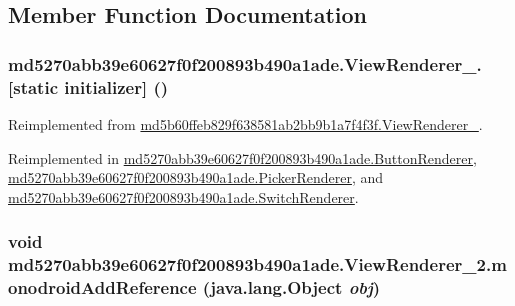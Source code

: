 \subsection{Member Function Documentation}
\hypertarget{classmd5270abb39e60627f0f200893b490a1ade_1_1_view_renderer__2_30528b2f26688d4ae24a58b2a1865a93}{
\subsubsection[{[static initializer]}]{\setlength{\rightskip}{0pt plus 5cm}md5270abb39e60627f0f200893b490a1ade.ViewRenderer\_.\mbox{[}static initializer\mbox{]} ()}}
\label{classmd5270abb39e60627f0f200893b490a1ade_1_1_view_renderer__2_30528b2f26688d4ae24a58b2a1865a93}




Reimplemented from \hyperlink{classmd5b60ffeb829f638581ab2bb9b1a7f4f3f_1_1_view_renderer__2_a0898cf56fa9a49b653470eaf1608e77}{md5b60ffeb829f638581ab2bb9b1a7f4f3f.ViewRenderer\_}.

Reimplemented in \hyperlink{classmd5270abb39e60627f0f200893b490a1ade_1_1_button_renderer_185a2314a4c48ba4c84aff8feb113b1e}{md5270abb39e60627f0f200893b490a1ade.ButtonRenderer}, \hyperlink{classmd5270abb39e60627f0f200893b490a1ade_1_1_picker_renderer_7f4af5558fac1d77cc8636bb243421cf}{md5270abb39e60627f0f200893b490a1ade.PickerRenderer}, and \hyperlink{classmd5270abb39e60627f0f200893b490a1ade_1_1_switch_renderer_1ec023784c291e40dea5636e84ab320b}{md5270abb39e60627f0f200893b490a1ade.SwitchRenderer}.\hypertarget{classmd5270abb39e60627f0f200893b490a1ade_1_1_view_renderer__2_04a86dd6eb699648d23fe42d567c6962}{
\subsubsection[{monodroidAddReference}]{\setlength{\rightskip}{0pt plus 5cm}void md5270abb39e60627f0f200893b490a1ade.ViewRenderer\_\-2.monodroidAddReference (java.lang.Object {\em obj})}}
\label{classmd5270abb39e60627f0f200893b490a1ade_1_1_view_renderer__2_04a86dd6eb699648d23fe42d567c6962}




